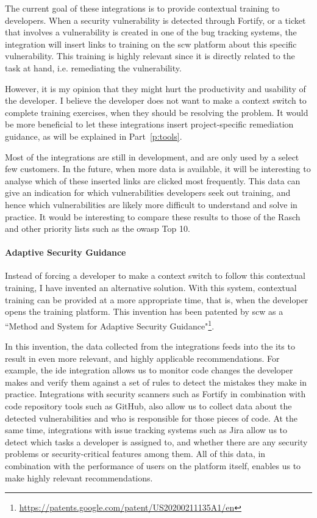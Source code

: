 The current goal of these integrations is to provide contextual training to developers.
When a security vulnerability is detected through Fortify, or a ticket that involves a vulnerability is created in one of the bug tracking systems, the integration will insert links to training on the \gls{scw} platform about this specific vulnerability.
This training is highly relevant since it is directly related to the task at hand, i.e. remediating the vulnerability.

However, it is my opinion that they might hurt the productivity and usability of the developer.
I believe the developer does not want to make a context switch to complete training exercises, when they should be resolving the problem.
It would be more beneficial to let these integrations insert project-specific remediation guidance, as will be explained in Part~\ref{p:tools}.

Most of the integrations are still in development, and are only used by a select few customers.
In the future, when more data is available, it will be interesting to analyse which of these inserted links are clicked most frequently.
This data can give an indication for which vulnerabilities developers seek out training, and hence which vulnerabilities are likely more difficult to understand and solve in practice.
It would be interesting to compare these results to those of the Rasch and other priority lists such as the \gls{owasp} Top 10.

\paragraph{Adaptive Security Guidance}
Instead of forcing a developer to make a context switch to follow this contextual training, I have invented an alternative solution.
With this system, contextual training can be provided at a more appropriate time, that is, when the developer opens the training platform.
This invention has been patented by \gls{scw} as a ``Method and System for Adaptive Security Guidance"\footnote{\url{https://patents.google.com/patent/US20200211135A1/en}}.

In this invention, the data collected from the integrations feeds into the \gls{its} to result in even more relevant, and highly applicable recommendations.
For example, the \gls{ide} integration allows us to monitor code changes the developer makes and verify them against a set of rules to detect the mistakes they make in practice.
Integrations with security scanners such as Fortify in combination with code repository tools such as GitHub, also allow us to collect data about the detected vulnerabilities and who is responsible for those pieces of code.
At the same time, integrations with issue tracking systems such as Jira allow us to detect which tasks a developer is assigned to, and whether there are any security problems or security-critical features among them.
All of this data, in combination with the performance of users on the platform itself, enables us to make highly relevant recommendations.

